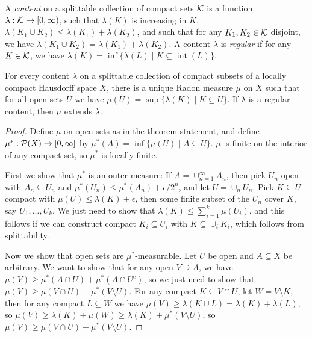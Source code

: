 \documentclass[letterpaper,11pt]{report}
\DeclareMathOperator{\inter}{int}
\begin{document}
\begin{defn} A \emph{content} on a splittable collection of compact sets $\mathcal{K}$ is a function $\lambda : \mathcal{K} \rightarrow [0,\infty)$, such that $\lambda(K)$ is increasing in $K$, $\lambda(K_1 \cup K_2) \le \lambda(K_1) + \lambda(K_2)$, and such that for any $K_1, K_2 \in \mathcal{K}$ disjoint, we have $\lambda(K_1 \cup K_2) = \lambda(K_1) + \lambda(K_2)$. A content $\lambda$ is \emph{regular} if for any $K \in \mathcal{K}$, we have $\lambda(K) = \inf \{\lambda(L) \mid K \subseteq \inter(L)\}$.
\end{defn}

\begin{thm}\label{content-measure} For every content $\lambda$ on a splittable collection of compact subsets of a locally compact Hausdorff space $X$, there is a unique Radon measure $\mu$ on $X$ such that for all open sets $U$ we have $\mu(U) = \sup\{\lambda(K) \mid K \subseteq U\}$. If $\lambda$ is a regular content, then $\mu$ extends $\lambda$.
\end{thm}
\begin{proof} Define $\mu$ on open sets as in the theorem statement, and define $\mu^* : \mathcal{P}(X) \rightarrow [0,\infty]$ by $\mu^*(A) = \inf \{\mu(U) \mid A \subseteq U\}$. $\mu$ is finite on the interior of any compact set, so $\mu^*$ is locally finite.

First we show that $\mu^*$ is an outer measure: If $A = \cup_{n=1}^\infty A_n$, then pick $U_n$ open with $A_n \subseteq U_n$ and $\mu^*(U_n) \le \mu^*(A_n) + \epsilon/2^n$, and let $U = \cup_n U_n$. Pick $K \subseteq U$ compact with $\mu(U) \le \lambda(K) + \epsilon$, then some finite subset of the $U_n$ cover $K$, say $U_1, ..., U_k$. We just need to show that $\lambda(K) \le \sum_{i=1}^k \mu(U_i)$, and this follows if we can construct compact $K_i \subseteq U_i$ with $K \subseteq \cup_i K_i$, which follows from splittability.

Now we show that open sets are $\mu^*$-measurable. Let $U$ be open and $A\subseteq X$ be arbitrary. We want to show that for any open $V \supseteq A$, we have $\mu(V) \ge \mu^*(A\cap U) + \mu^*(A\cap U^c)$, so we just need to show that $\mu(V) \ge \mu(V\cap U) + \mu^*(V\setminus U)$. For any compact $K \subseteq V\cap U$, let $W = V \setminus K$, then for any compact $L \subseteq W$ we have $\mu(V) \ge \lambda(K\cup L) = \lambda(K) + \lambda(L)$, so $\mu(V) \ge \lambda(K) + \mu(W) \ge \lambda(K) + \mu^*(V\setminus U)$, so $\mu(V) \ge \mu(V\cap U) + \mu^*(V\setminus U)$.
\end{proof}
\end{document}

